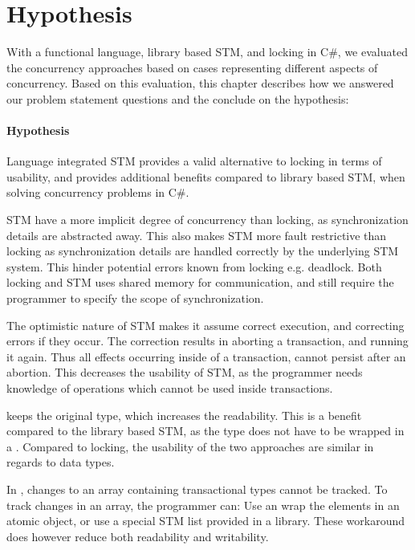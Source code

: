\section{Hypothesis}
With a functional \stmname language, library based \ac{STM}, and locking in C\#, we evaluated the concurrency approaches based on cases representing different aspects of concurrency. Based on this evaluation, this chapter describes how we answered our problem statement questions and the conclude on the hypothesis: 

\paragraph{Hypothesis} Language integrated \ac{STM} provides a valid alternative to locking in terms of usability, and provides additional benefits compared to library based \ac{STM}, when solving concurrency problems in C\#. 

\ac{STM} have a more implicit degree of concurrency than locking, as synchronization details are abstracted away. This also makes \ac{STM} more fault restrictive than locking as synchronization details are handled correctly by the underlying \ac{STM} system. This hinder potential errors known from locking e.g. deadlock. Both locking and \ac{STM} uses shared memory for communication, and still require the programmer to specify the scope of synchronization.

The optimistic nature of \ac{STM} makes it assume correct execution, and correcting errors if they occur. The correction results in aborting a transaction, and running it again. Thus all effects occurring inside of a transaction, cannot persist after an abortion. This decreases the usability of \ac{STM}, as the programmer needs knowledge of operations which cannot be used inside transactions.

\stmname keeps the original type, which increases the readability. This is a benefit compared to the library based \ac{STM}, as the type does not have to be wrapped in a . Compared to locking, the usability of the two approaches are similar in regards to data types. 

In \stmname, changes to an array containing transactional types cannot be tracked. To track changes in an array, the programmer can: Use an  wrap the elements in an atomic object, or use a special \ac{STM} list provided in a library. These workaround does however reduce both readability and writability. 

